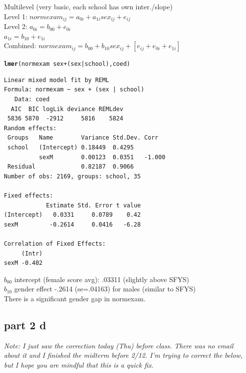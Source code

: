 \documentclass{article}\usepackage{graphicx, color}
\makeatletter
\newcommand{\hlfunctioncall}[1]{\textcolor[rgb]{0.501960784313725,0,0.329411764705882}{\textbf{#1}}}%
\newenvironment{kframe}{%
 \def\at@end@of@kframe{}%
 \ifinner\ifhmode%
  \def\at@end@of@kframe{\end{minipage}}%
  \begin{minipage}{\columnwidth}%
 \fi\fi%
 \def\FrameCommand##1{\hskip\@totalleftmargin \hskip-\fboxsep
 \colorbox{shadecolor}{##1}\hskip-\fboxsep
     \hskip-\linewidth \hskip-\@totalleftmargin \hskip\columnwidth}%
 \MakeFramed {\advance\hsize-\width
   \@totalleftmargin\z@ \linewidth\hsize
   \@setminipage}}%
 {\par\unskip\endMakeFramed%
 \at@end@of@kframe}
\newenvironment{knitrout}{}{} %
\makeatother
\begin{document}
Multilevel (very basic, each school has own inter./slope)\\
Level 1: $normexam_{ij} = a_{0i} + a_{1i} sex_{ij} + e_{ij}$\\
Level 2: $a_{0i} = b_{00} + e_{0i}$\\
          $a_{1i} = b_{10} + e_{1i}$\\
Combined: $normexam_{ij} = b_{00} + b_{10} sex_{ij} + [e_{ij}+e_{0i}+e_{1i}]$\\
\begin{knitrout}
\color{fgcolor}\begin{kframe}
\begin{alltt}
\hlfunctioncall{lmer}(normexam~sex+(sex|school), coed)
\end{alltt}
\begin{verbatim}
Linear mixed model fit by REML 
Formula: normexam ~ sex + (sex | school) 
   Data: coed 
  AIC  BIC logLik deviance REMLdev
 5836 5870  -2912     5816    5824
Random effects:
 Groups   Name        Variance Std.Dev. Corr   
 school   (Intercept) 0.18449  0.4295          
          sexM        0.00123  0.0351   -1.000 
 Residual             0.82187  0.9066          
Number of obs: 2169, groups: school, 35

Fixed effects:
            Estimate Std. Error t value
(Intercept)   0.0331     0.0789    0.42
sexM         -0.2614     0.0416   -6.28

Correlation of Fixed Effects:
     (Intr)
sexM -0.402
\end{verbatim}
\end{kframe}
\end{knitrout}

$b_{00}$ intercept (female score avg): .03311 (slightly above SFYS)\\
$b_{10}$ gender effect -.2614 (se=.04163) for males (similar to SFYS)\\
There is a significant gender gap in normexam.

\subsection*{part 2 d}
\emph{Note: I just saw the correction today (Thu) before class. There was no email about it and I finished the midterm before 2/12. I'm trying to correct the below, but I hope you are mindful that this is a quick fix.}
\end{document}
